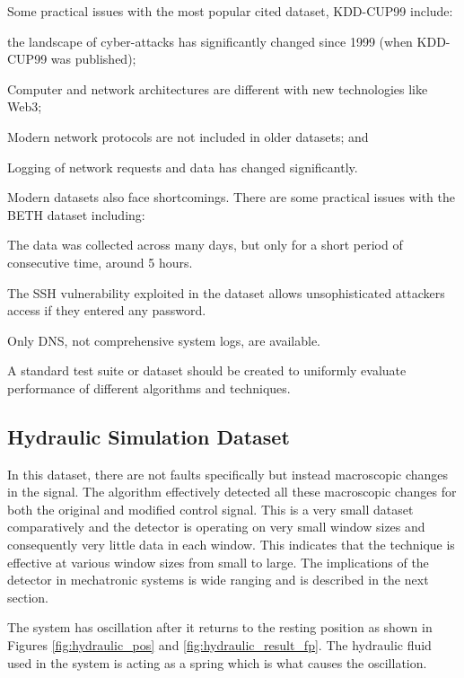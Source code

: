 Some practical issues with the most popular cited dataset, KDD-CUP99 include:
\begin{inlinelist}
    \item the landscape of cyber-attacks has significantly changed since 1999 (when KDD-CUP99 was published);
    \item Computer and network architectures are different with new technologies like Web3;
    \item Modern network protocols are not included in older datasets; and
    \item Logging of network requests and data has changed significantly.
\end{inlinelist}

Modern datasets also face shortcomings. There are some practical issues with the BETH dataset including:
\begin{inlinelist}
    \item The data was collected across many days, but only for a short period of consecutive time, around 5 hours.
    \item The SSH vulnerability exploited in the dataset allows unsophisticated attackers access if they entered any password.
    \item Only DNS, not comprehensive system logs, are available.
\end{inlinelist}
A standard test suite or dataset should be created to uniformly evaluate performance of different algorithms and techniques.

\subsection{Hydraulic Simulation Dataset}

In this dataset, there are not faults specifically but instead macroscopic changes in the signal. The algorithm effectively detected all these macroscopic changes for both the original and modified control signal. This is a very small dataset comparatively and the detector is operating on very small window sizes and consequently very little data in each window. This indicates that the technique is effective at various window sizes from small to large. The implications of the detector in mechatronic systems is wide ranging and is described in the next section.

The system has oscillation after it returns to the resting position as shown in Figures \ref{fig:hydraulic_pos} and \ref{fig:hydraulic_result_fp}. The hydraulic fluid used in the system is acting as a spring which is what causes the oscillation. 

